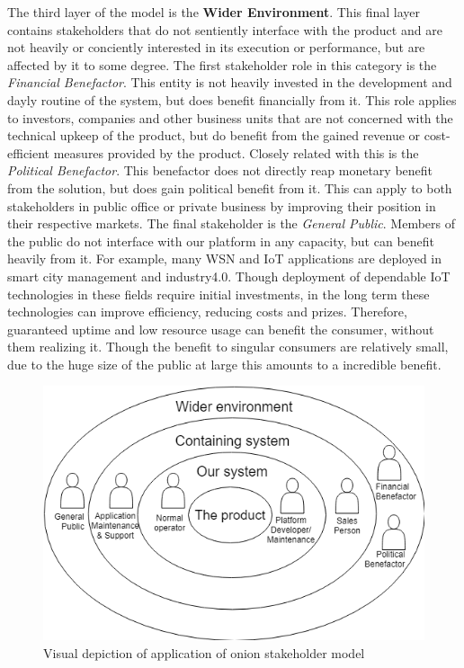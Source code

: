 The third layer of the model is the \textbf{Wider Environment}. This final layer contains stakeholders that do not sentiently interface with the product and are not heavily or conciently interested in its execution or performance, but are affected by it to some degree. The first stakeholder role in this category is the \emph{Financial Benefactor}. This entity is not heavily invested in the development and dayly routine of the system, but does benefit financially from it. This role applies to investors, companies and other business units that are not concerned with the technical upkeep of the product, but do benefit from the gained revenue or cost-efficient measures provided by the product. Closely related with this is the \emph{Political Benefactor}. This benefactor does not directly reap monetary benefit from the solution, but does gain political benefit from it. This can apply to both stakeholders in public office or private business by improving their position in their respective markets. The final stakeholder is the \emph{General Public}. Members of the public do not interface with our platform in any capacity, but can benefit heavily from it. For example, many WSN and IoT applications are deployed in smart city management and industry4.0\cite{voorbeelden}. Though deployment of dependable IoT technologies in these fields require initial investments, in the long term these technologies can improve efficiency, reducing costs and prizes. Therefore, guaranteed uptime and low resource usage can benefit the consumer, without them realizing it. Though the benefit to singular consumers are relatively small, due to the huge size of the public at large this amounts to a incredible benefit.

\begin{figure}
\centering
\includegraphics[width=.7\textwidth]{resources/img/onion.png}
\caption{Visual depiction of application of onion stakeholder model}
\label{fig:onion}
\end{figure}

